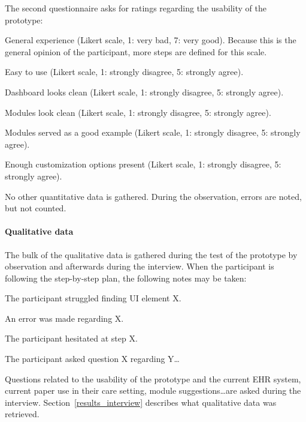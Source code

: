     \noindent The second questionnaire asks for ratings regarding the usability of the prototype: 
    \vspace{-6pt}
    \begin{myitemize}
        \item General experience (Likert scale, 1: very bad, 7: very good). Because this is the general opinion of the participant, more steps are defined for this scale.
        \item Easy to use (Likert scale, 1: strongly disagree, 5: strongly agree).
        \item Dashboard looks clean (Likert scale, 1: strongly disagree, 5: strongly agree).
        \item Modules look clean (Likert scale, 1: strongly disagree, 5: strongly agree).
        \item Modules served as a good example (Likert scale, 1: strongly disagree, 5: strongly agree).
        \item Enough customization options present (Likert scale, 1: strongly disagree, 5: strongly agree).
    \end{myitemize}

    \noindent No other quantitative data is gathered. During the observation, errors are noted, but not counted.

    \paragraph{Qualitative data} The bulk of the qualitative data is gathered during the test of the prototype by observation and afterwards during the interview. When the participant is following the step-by-step plan, the following notes may be taken:
    \vspace{-6pt}
    \begin{myitemize}
        \item The participant struggled finding UI element X.
        \item An error was made regarding X.
        \item The participant hesitated at step X.
        \item The participant asked question X regarding Y\ldots
    \end{myitemize}

    \noindent Questions related to the usability of the prototype and the current EHR system, current paper use in their care setting, module suggestions\ldots are asked during the interview. Section~\ref{results_interview} describes what qualitative data was retrieved.

